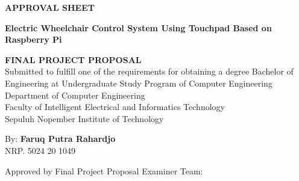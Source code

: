 \begin{center}
	\large
  \textbf{APPROVAL SHEET}
\end{center}

\thispagestyle{empty}

\begin{center}
  \textbf{Electric Wheelchair Control System Using Touchpad Based on Raspberry Pi}
\end{center}

\begingroup
  \small

  \begin{center}
    \textbf{FINAL PROJECT PROPOSAL} \\
    Submitted to fulfill one of the requirements for obtaining a degree
    Bachelor of Engineering at 
    Undergraduate Study Program of Computer Engineering \\
    Department of Computer Engineering \\
    Faculty of Intelligent Electrical and Informatics Technology \\
    Sepuluh Nopember Institute of Technology
  \end{center}

  \begin{center}
    By: \textbf{Faruq Putra Rahardjo} \\
    NRP. 5024 20 1049
  \end{center}

  \begin{center}
    Approved by Final Project Proposal Examiner Team:
  \end{center}

  \begingroup
    \setlength{\tabcolsep}{0pt}

